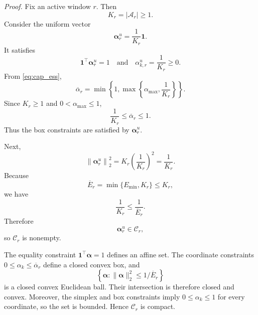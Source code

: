 \documentclass[letterpaper,journal]{IEEEtran}
\begin{document}
\noindent\emph{Proof.}
Fix an active window $r$.  Then
\begin{equation}
    K_r=|\mathcal{A}_r|\ge1.
    \label{eq:app_K_positive}
\end{equation}
Consider the uniform vector
\begin{equation}
    \boldsymbol\alpha_r^{u}
    =
    \frac{1}{K_r}\mathbf{1}.
    \label{eq:app_uniform_alpha}
\end{equation}
It satisfies
\begin{equation}
    \mathbf{1}^{\top}\boldsymbol\alpha_r^{u}=1
    \quad\text{and}\quad
    \alpha_{k,r}^{u}=\frac{1}{K_r}\ge0.
    \label{eq:app_uniform_simplex}
\end{equation}
From \eqref{eq:cap_ess},
\begin{equation}
    \overline\alpha_r
    =
    \min\left\{
    1,
    \max\left\{
    \alpha_{\max},
    \frac{1}{K_r}
    \right\}
    \right\}.
    \label{eq:app_alpha_bar}
\end{equation}
Since $K_r\ge1$ and $0<\alpha_{\max}\le1$,
\begin{equation}
    \frac{1}{K_r}\le\overline\alpha_r\le1.
    \label{eq:app_uniform_box}
\end{equation}
Thus the box constraints are satisfied by
$\boldsymbol\alpha_r^{u}$.

Next,
\begin{equation}
    \left\|
    \boldsymbol\alpha_r^{u}
    \right\|_2^2
    =
    K_r\left(\frac{1}{K_r}\right)^2
    =
    \frac{1}{K_r}.
    \label{eq:app_uniform_l2}
\end{equation}
Because
\begin{equation}
    \overline E_r
    =
    \min\{E_{\min},K_r\}
    \le K_r,
    \label{eq:app_Ebar_leq_K}
\end{equation}
we have
\begin{equation}
    \frac{1}{K_r}
    \le
    \frac{1}{\overline E_r}.
    \label{eq:app_uniform_ess}
\end{equation}
Therefore
\begin{equation}
    \boldsymbol\alpha_r^{u}
    \in
    \mathcal{C}_r,
    \label{eq:app_C_nonempty}
\end{equation}
so $\mathcal{C}_r$ is nonempty.

The equality constraint
$\mathbf{1}^{\top}\boldsymbol\alpha=1$ defines an affine set.  The coordinate
constraints
$0\le\alpha_k\le\overline\alpha_r$ define a closed convex box, and
\begin{equation}
    \left\{
    \boldsymbol\alpha:
    \|\boldsymbol\alpha\|_2^2
    \le
    1/\overline E_r
    \right\}
    \label{eq:app_l2_ball}
\end{equation}
is a closed convex Euclidean ball.  Their intersection is therefore closed and
convex.  Moreover, the simplex and box constraints imply
$0\le\alpha_k\le1$ for every coordinate, so the set is bounded.  Hence
$\mathcal{C}_r$ is compact.
\end{document}
